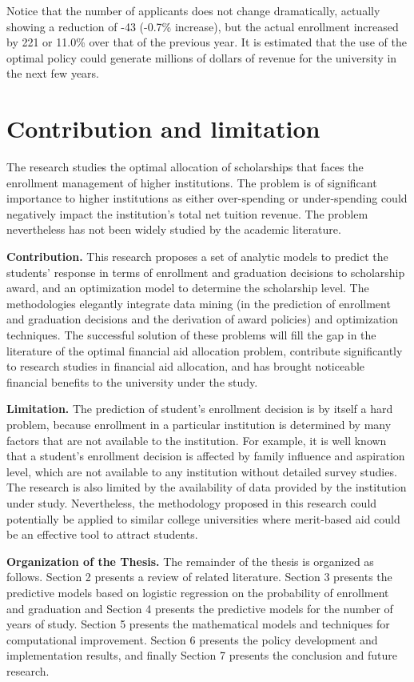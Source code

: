 \documentclass[12pt,english]{report}
\begin{document}
Notice that the number of applicants does not change dramatically, actually showing a reduction of -43 (-0.7\% increase), but the actual enrollment increased by 221  or 11.0\% over that of the previous year.  It is estimated that the use of the optimal policy could generate millions of dollars of revenue for the university in the next few years.

\section{Contribution and limitation}
The research studies the optimal allocation of scholarships that faces the enrollment management of higher institutions.  The problem is of significant importance to higher institutions as either over-spending or under-spending could negatively impact the institution's total net tuition revenue.  The problem nevertheless has not been widely studied by the academic literature.

\textbf{Contribution.} This research proposes a set of analytic models to predict the students' response in terms of enrollment and graduation decisions to scholarship award, and an optimization model to determine the scholarship level.  The methodologies elegantly integrate data mining (in the prediction of enrollment and graduation decisions and the derivation of award policies) and optimization techniques. The successful solution of these problems will fill the gap in the literature of the optimal financial aid allocation problem, contribute significantly to research studies in financial aid allocation, and has brought noticeable financial benefits to the university under the study.

\textbf{Limitation.} The prediction of student's enrollment decision is by itself a hard problem,  because enrollment in a particular institution is determined by many factors that are not available to the institution.  For example, it is well known that a student's enrollment decision is affected by family influence and aspiration level, which are not available to any institution without detailed survey studies.  The research is also limited by the availability of data provided by the institution under study.   Nevertheless, the methodology proposed in this research could potentially be applied to similar college universities where merit-based aid could be an effective tool to attract students.

\vspace{0.25in}
\noindent \textbf{Organization of the Thesis.} The remainder of the thesis is organized as follows. Section 2 presents a review of related literature. Section 3 presents the predictive models based on logistic regression on the probability of enrollment and graduation and Section 4 presents the predictive models for the number of years of study. Section 5 presents the mathematical models and techniques for computational improvement. Section 6 presents the policy development and implementation results, and finally Section 7 presents the conclusion and  future research.
\end{document}
